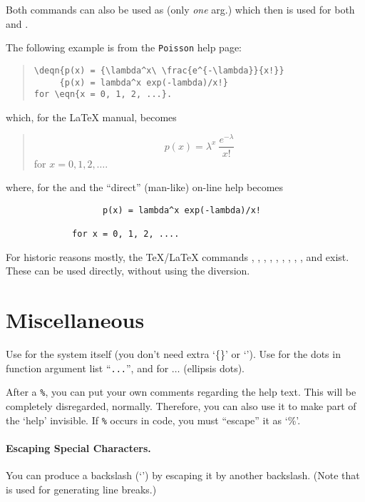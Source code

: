 Both commands can also be used as 
(only \emph{one} arg.) which then is used for both  and .

The following example is from the \texttt{Poisson} help page:
\begin{quote}
\begin{verbatim}
\deqn{p(x) = {\lambda^x\ \frac{e^{-\lambda}}{x!}}
     {p(x) = lambda^x exp(-lambda)/x!}
for \eqn{x = 0, 1, 2, ...}.
\end{verbatim}
\end{quote}
which, for the \LaTeX{} manual, becomes
\begin{quote}
  \[ p(x) = \lambda^x\ \frac{e^{-\lambda}}{x!}  \]
  for $ x = 0, 1, 2, \ldots $.
\end{quote}
where, for the \HTML{} and the ``direct'' (man-like) on-line help
becomes
\begin{verbatim}
                   p(x) = lambda^x exp(-lambda)/x!

             for x = 0, 1, 2, ....
\end{verbatim}

For historic reasons mostly, the TeX/LaTeX commands ,
, , , , ,
, , ,  and  exist.
These can be used directly, without using the  diversion.

\section{Miscellaneous}

Use  for the \R{} system itself (you don't need extra `\{\}' or `\bsl').
Use  for the dots in function argument list ``\texttt{...}'',
and  for $\ldots$ (ellipsis dots).

After a \texttt{\%}, you can put your own comments regarding the help
text. This will be completely disregarded, normally. Therefore, you can
also use it to make part of the `help' invisible.  If \texttt{\%} occurs
in \R{} code, you must ``escape'' it as `\%'.

\paragraph{Escaping Special Characters.}
You can produce a backslash (`\bsl') by escaping it by another
backslash.  (Note that  is used for generating line breaks.)

